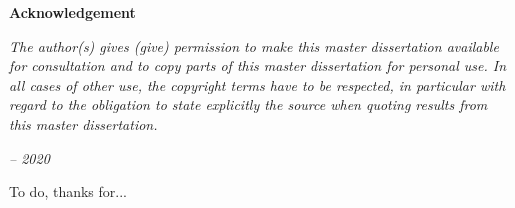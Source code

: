 \thispagestyle{empty}    %

\begin{center}
\textbf{Acknowledgement}
\end{center}

\emph{
The author(s) gives (give) permission to make this master dissertation available for
consultation and to copy parts of this master dissertation for personal use.
In all cases of other use, the copyright terms have to be respected, in particular with regard to
the obligation to state explicitly the source when quoting results from this master dissertation.
}
\begin{flushright}
\emph{-- 2020}
\end{flushright}

To do, thanks for...
